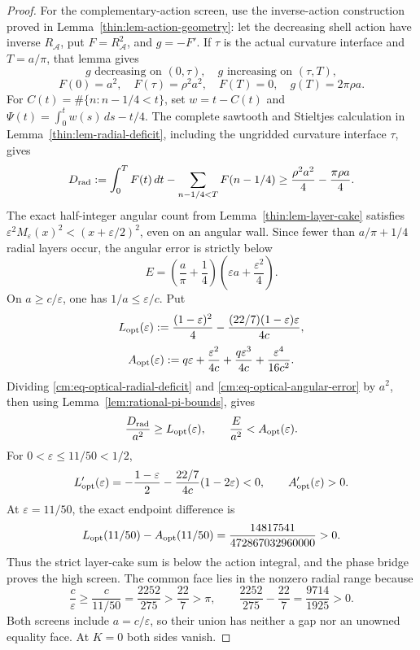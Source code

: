 \documentclass[11pt]{article}
\numberwithin{equation}{section}
\theoremstyle{definition}
\theoremstyle{remark}
\begin{document}
\begin{proof}
For the complementary-action screen, use the inverse-action construction
proved in Lemma~\ref{thin:lem-action-geometry}: let the decreasing shell
action have inverse \(R_{\mathcal A}\), put \(F=R_{\mathcal A}^2\), and
\(g=-F'\).  If \(\tau\) is the actual curvature interface and
\(T=a/\pi\), that lemma gives
\[
 g\text{ decreasing on }(0,\tau),\quad
 g\text{ increasing on }(\tau,T),
\]
\[
 F(0)=a^2,\quad F(\tau)=\rho^2a^2,\quad F(T)=0,\quad
 g(T)=2\pi\rho a.
\]
For \(C(t)=\#\{n:n-1/4<t\}\), set \(w=t-C(t)\) and
\(\Psi(t)=\int_0^tw(s)\,ds-t/4\).  The complete sawtooth and Stieltjes
calculation in Lemma~\ref{thin:lem-radial-deficit}, including the ungridded
curvature interface \(\tau\), gives
\begin{equation}
 D_{\rm rad}:=\int_0^TF(t)\,dt
 -\sum_{n-1/4<T}F(n-1/4)
 \geq\frac{\rho^2a^2}{4}-\frac{\pi\rho a}{4}.
 \label{cm:eq-optical-radial-deficit}
\end{equation}
The exact half-integer angular count from
Lemma~\ref{thin:lem-layer-cake} satisfies
\(\varepsilon^2M_\varepsilon(x)^2<(x+\varepsilon/2)^2\), even on an
angular wall.  Since fewer than \(a/\pi+1/4\) radial layers occur, the
angular error is strictly below
\begin{equation}
 E=\left(\frac a\pi+\frac14\right)
 \left(\varepsilon a+\frac{\varepsilon^2}{4}\right).
 \label{cm:eq-optical-angular-error}
\end{equation}
On \(a\geq c/\varepsilon\), one has \(1/a\leq\varepsilon/c\).  Put
\[
 L_{\rm opt}(\varepsilon)
 :=\frac{(1-\varepsilon)^2}{4}
 -\frac{(22/7)(1-\varepsilon)\varepsilon}{4c},
\]
\[
 A_{\rm opt}(\varepsilon)
 :=q\varepsilon+\frac{\varepsilon^2}{4c}
 +\frac{q\varepsilon^3}{4c}
 +\frac{\varepsilon^4}{16c^2}.
\]
Dividing \eqref{cm:eq-optical-radial-deficit} and
\eqref{cm:eq-optical-angular-error} by \(a^2\), then using
Lemma~\ref{lem:rational-pi-bounds}, gives
\[
 \frac{D_{\rm rad}}{a^2}\geq L_{\rm opt}(\varepsilon),
 \qquad
 \frac{E}{a^2}<A_{\rm opt}(\varepsilon).
\]
For \(0<\varepsilon\leq11/50<1/2\),
\[
 L_{\rm opt}'(\varepsilon)
 =-\frac{1-\varepsilon}{2}
 -\frac{22/7}{4c}(1-2\varepsilon)<0,
 \qquad
 A_{\rm opt}'(\varepsilon)>0.
\]
At \(\varepsilon=11/50\), the exact endpoint difference is
\begin{equation}
 L_{\rm opt}(11/50)-A_{\rm opt}(11/50)
 =\frac{14817541}{472867032960000}>0.
 \label{cm:eq-optical-high-reserve}
\end{equation}
Thus the strict layer-cake sum is below the action integral, and the phase
bridge proves the high screen.  The common face lies in the nonzero radial
range because
\[
 \frac c\varepsilon\geq\frac{c}{11/50}
 =\frac{2252}{275}>\frac{22}{7}>\pi,
 \qquad
 \frac{2252}{275}-\frac{22}{7}=\frac{9714}{1925}>0.
\]
Both screens include \(a=c/\varepsilon\), so their union has neither a gap
nor an unowned equality face.  At \(K=0\) both sides vanish.
\end{proof}
\end{document}
